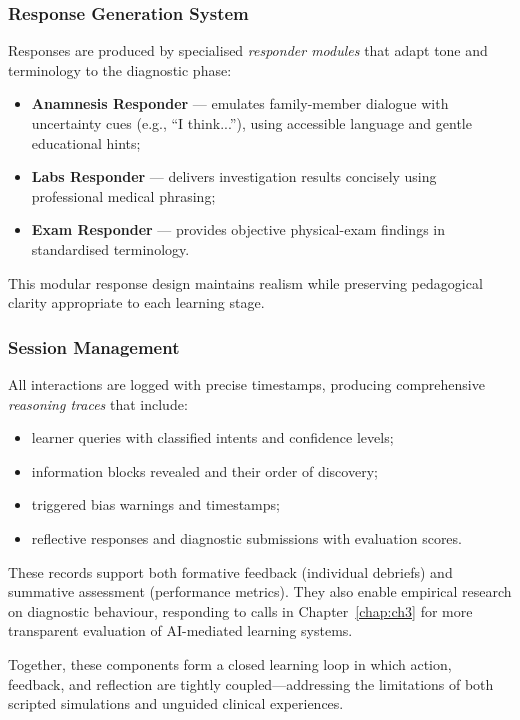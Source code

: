 \subsubsection{Response Generation System}

Responses are produced by specialised \textit{responder modules} that adapt tone
and terminology to the diagnostic phase:

\begin{itemize}
  \item \textbf{Anamnesis Responder} — emulates family-member dialogue with
  uncertainty cues (e.g., ``I think...''), using accessible language and gentle
  educational hints;
  \item \textbf{Labs Responder} — delivers investigation results concisely using
  professional medical phrasing;
  \item \textbf{Exam Responder} — provides objective physical-exam findings in
  standardised terminology.
\end{itemize}

This modular response design maintains realism while preserving pedagogical
clarity appropriate to each learning stage.

\subsubsection{Session Management}

All interactions are logged with precise timestamps, producing comprehensive
\textit{reasoning traces} that include:

\begin{itemize}
  \item learner queries with classified intents and confidence levels;
  \item information blocks revealed and their order of discovery;
  \item triggered bias warnings and timestamps;
  \item reflective responses and diagnostic submissions with evaluation scores.
\end{itemize}

These records support both formative feedback (individual debriefs) and summative
assessment (performance metrics).  
They also enable empirical research on diagnostic behaviour, responding to calls
in Chapter~\ref{chap:ch3} for more transparent evaluation of AI-mediated learning
systems.

\medskip
Together, these components form a closed learning loop in which action, feedback,
and reflection are tightly coupled—addressing the limitations of both scripted
simulations and unguided clinical experiences.

